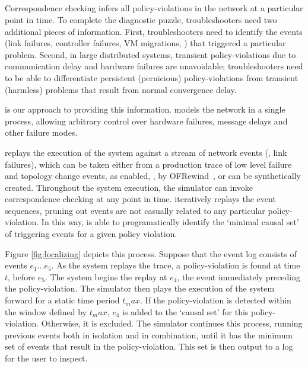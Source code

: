 \subsection{\SIMULATOR{}}

Correspondence checking infers all policy-violations in the network at a
particular point in time. To complete the diagnostic puzzle, troubleshooters
need two additional pieces of information. First, troubleshooters need to
identify the events (link failures, controller failures, VM migrations,
\etc{}) that triggered a particular problem. Second, in large distributed
systems, transient policy-violations due to communication delay and hardware
failures are unavoidable; troubleshooters need to be able to differentiate
persistent (pernicious) policy-violations from transient (harmless) problems
that result from normal convergence delay.

\Simulator{} is our approach to providing this information. \Simulator{} models
the network in a single process, allowing arbitrary control over hardware
failures, 
message delays and other failure modes.

\Simulator{} replays the execution of the system against
a stream of network events (\eg{}, link failures), which can be taken
either from a production trace of low level failure and topology change
events, as enabled, \eg{}, by OFRewind~\cite{ofrewind},
or can be synthetically created. Throughout the system execution, the simulator can invoke correspondence checking at any
point in time. \Simulator{} iteratively replays
the event sequences, pruning out events are not casually related to any
particular
policy-violation. In this way, \simulator{} is able to
programatically identify the `minimal causal set' of triggering events for a
given policy violation.

Figure \ref{fig:localizing} depicts this process. Suppose that the event log
consists of events $e_{1}\dots{}e_{5}$. As the system replays the trace, a 
policy-violation is found at time $t$, before $e_{5}$. The system
begins the replay at $e_{4}$, the event immediately preceding the
policy-violation. The simulator then plays the execution of the system forward
for a static time period $t_max$. If the policy-violation is detected within the window
defined by $t_max$, $e_{4}$ is added to the `causal set' for this
policy-violation. Otherwise, it is excluded. The simulator continues this
process, running previous events both in isolation and in combination, until
it has the minimum set of events that result in the policy-violation. This set
is then output to a log for the user to inspect.

